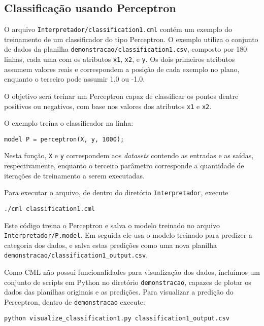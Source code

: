 \documentclass[12pt]{article}
\begin{document}
\subsection{Classificação usando Perceptron}

O arquivo \texttt{Interpretador/classification1.cml} contém um exemplo do treinamento de um classificador do tipo Perceptron. O exemplo utiliza o conjunto de dados da planilha \texttt{demonstracao/classification1.csv}, composto por 180 linhas, cada uma com os atributos \texttt{x1}, \texttt{x2}, e \texttt{y}. Os dois primeiros atributos assumem valores reais e correspondem a posição de cada exemplo no plano, enquanto o terceiro pode assumir 1.0 ou -1.0.

O objetivo será treinar um Perceptron capaz de classificar os pontos dentre positivos ou negativos, com base nos valores dos atributos \texttt{x1} e \texttt{x2}.

O exemplo treina o classificador na linha:

\begin{verbatim}
model P = perceptron(X, y, 1000);
\end{verbatim}

Nesta função, \texttt{X} e \texttt{y} correspondem aos \textit{datasets} contendo as entradas e as saídas, respectivamente, enquanto o terceiro parâmetro corresponde a quantidade de iterações de treinamento a serem executadas.

Para executar o arquivo, de dentro do diretório \texttt{Interpretador}, execute

\begin{verbatim}
./cml classification1.cml
\end{verbatim}

Este código treina o Perceptron e salva o modelo treinado no arquivo \texttt{Interpretador/P.model}. Em seguida ele usa o modelo treinado para predizer a categoria dos dados, e salva estas predições como uma nova planilha \texttt{demonstracao/classification1\_output.csv}.

Como CML não possui funcionalidades para visualização dos dados, incluímos um conjunto de scripts em Python no diretório \texttt{demonstracao}, capazes de plotar os dados das planilhas originais e as predições. Para visualizar a predição do Perceptron, dentro de \texttt{demonstracao} execute:

\begin{verbatim}
python visualize_classification1.py classification1_output.csv
\end{verbatim}
\end{document}
